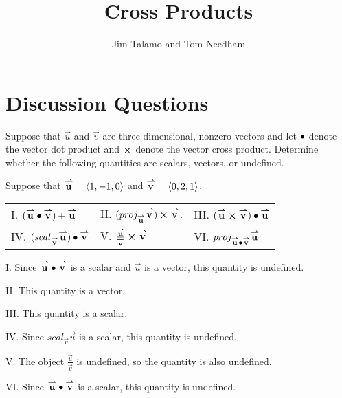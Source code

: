 \documentclass[noauthor, handout]{ximera}
\author{Jim Talamo and Tom Needham}
\title[Collaborate:]{Cross Products}
\begin{document}
\begin{abstract}
\end{abstract}
\maketitle

\section{Discussion Questions}

\begin{problem}
Suppose that $\vec{u}$ and $\vec{v}$ are three dimensional, nonzero vectors and let $\dotp$ denote the vector dot product and $\cross$ denote the vector cross product.  Determine whether the following quantities are scalars, vectors, or undefined. 

Suppose that $\vec{u} = \vector{1,-1,0}$ and $\vec{v} = \vector{0,2,1}$.

\begin{tabular}{lll}
I. $(\vec{u} \dotp \vec{v})+\vec{u}$ \qquad \qquad \qquad & II. $(proj_{\vec{u}} \vec{v}) \cross \vec{v}$.   \qquad \qquad  & III. $(\vec{u} \cross \vec{v}) \dotp \vec{u}$\\[2ex]
IV. $(scal_{\vec{v}} \vec{u}) \dotp \vec{v}$ & V. $\frac{\vec{u}}{\vec{v}} \cross \vec{v}$ & VI. $proj_{\vec{u} \dotp \vec{v}} \vec{u}$
\end{tabular}

\begin{freeResponse}
I. Since $\vec{u} \dotp \vec{v}$ is a scalar and $\vec{u}$ is a vector, this quantity is undefined.

II. This quantity is a vector.

III. This quantity is a scalar.

IV. Since $scal_{\vec{v}} \vec{u}$ is a scalar, this quantity is undefined. 

V. The object $\frac{\vec{u}}{\vec{v}}$ is undefined, so the quantity is also undefined. 

VI. Since $\vec{u} \dotp \vec{v}$ is a scalar, this quantity is undefined. 
\end{freeResponse}

\end{problem}
\end{document}
